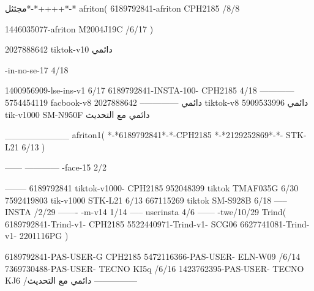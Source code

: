 مجثثل*-*++++*-*
afriton(
6189792841-afriton CPH2185  /8/8

1446035077-afriton M2004J19C  /6/17
)

2027888642 tiktok-v10
دائمي

-in-no-se-17 4/18

1400956909-lse-ins-v1 6/17
6189792841-INSTA-100- CPH2185 4/18
------------
5754454119 facbook-v8
دائمي
--------------
2027888642 tiktok-v8
دائمي
5909533996 tik-v1000  SM-N950F
دائمي مع التحديث

__________
afriton1(
*-*6189792841*-*-CPH2185
*-*2129252869*-*- STK-L21  6/13
)


------
------------
-face-15 2/2

--------
6189792841 tiktok-v1000- CPH2185 
952048399 tiktok TMAF035G  6/30
7592419803 tik-v1000 STK-L21  6/13
667115269 tiktok SM-S928B  6/18
-----
 INSTA /2/29
-------
-m-v14 1/14
-----
userinsta 4/6
------
-twe/10/29
Trind(
6189792841-Trind-v1- CPH2185 
5522440971-Trind-v1- SCG06 \6
6627741081-Trind-v1- 2201116PG \6
)


6189792841-PAS-USER-G CPH2185 
5472116366-PAS-USER- ELN-W09  /6/14
7369730488-PAS-USER- TECNO KI5q  /6/16
1423762395-PAS-USER- TECNO KJ6  /دائمي مع التحديث
    ---------------
